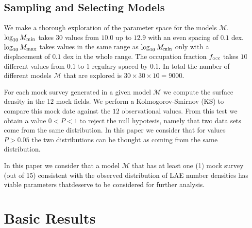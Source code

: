 \documentclass[usenatbib]{mn2e}
\begin{document}
\subsection{Sampling and Selecting Models}

We make a thorough exploration of the parameter space for the models
${\mathcal M}$. $\log_{10} M_{\rm min}$ takes $30$ values from $10.0$ up
to $12.9$ with an even spacing of $0.1$ dex. $\log_{10} M_{\rm max}$
takes values in the same range as $\log_{10}M_{\rm min}$ only with a
displacement of $0.1$ dex in the whole range. The occupation fraction
$f_{\rm occ}$ takes $10$ different values from $0.1$ to $1$ regulary
spaced by $0.1$. In total the number of different models ${\mathcal
  M}$ that are explored is $30 \times 30 \times 10 = 9000$.

For each mock survey generated in a given model ${\mathcal M}$ we
compute the surface density in the $12$ mock fields. We perform a
Kolmogorov-Smirnov (KS) to compare this mock date against the $12$
observational values. From this test we obtain a value $0<P<1$ to
reject the null hypotesis, namely that two data sets come from the
same distribution. In this paper we consider that for values $P>0.05$
the two distributions can be thought as coming from the same
distribution.

In this paper we consider that a model
${\mathcal M}$ that has at least one (1) mock survey (out of 15)
consistent with the observed distribution of LAE number densities has
viable parameters thatdeserve to be considered for further analysis.  

\section{Basic Results}
\end{document}
